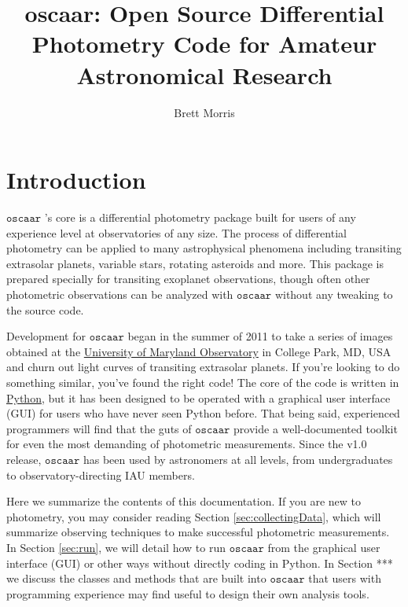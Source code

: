 \documentclass{article}
\begin{document}
\title{\textbf{oscaar}: Open Source Differential Photometry Code for Amateur Astronomical Research}
\author{Brett Morris}
\maketitle
\tableofcontents
\section{Introduction}

\newcommand{\oscaar}{$ \mathtt{oscaar}$ }
\newcommand{\code}[1]{\texttt{#1}}
\newcommand{\init}{\code{init.par}\ }

\oscaar's core is a differential photometry package built for users of any experience level at observatories of any size. The process of differential photometry can be applied to many astrophysical phenomena including transiting extrasolar planets, variable stars, rotating asteroids and more. This package is prepared specially for transiting exoplanet observations, though often other photometric observations can be analyzed with \oscaar without any tweaking to the source code.

Development for \oscaar began in the summer of 2011 to take a series of images obtained at the \href{http://www.astro.umd.edu/openhouse/}{University of Maryland Observatory} in College Park, MD, USA and churn out light curves of transiting extrasolar planets. If you're looking to do something similar, you've found the right code! The core of the code is written in \href{http://www.python.org/}{Python}, but it has been designed to be operated with a graphical user interface (GUI) for users who have never seen Python before. That being said, experienced programmers will find that the guts of \oscaar provide a well-documented toolkit for even the most demanding of photometric measurements. Since the v1.0 release, \oscaar has been used by astronomers at all levels, from undergraduates to observatory-directing IAU members.

Here we summarize the contents of this documentation. If you are new to photometry, you may consider reading Section \ref{sec:collectingData}, which will summarize observing techniques to make successful photometric measurements. In Section \ref{sec:run}, we will detail how to run \oscaar from the graphical user interface (GUI) or other ways without directly coding in Python. In Section *** we discuss the classes and methods that are built into \oscaar that users with programming experience may find useful to design their own analysis tools. 
\end{document}
